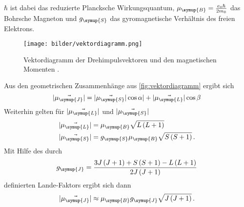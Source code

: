 $\hbar$ ist dabei das reduzierte Plancksche Wirkungsquantum, $\mu_{\symup{B}}=\frac{e_{0}\hbar}{2m_{0}}$ das
Bohrsche Magneton und $g_{\symup{S}}$ das gyromagnetische Verhältnis des freien Elektrons.
\begin{figure}
    \centering
    \texttt{[image: bilder/vektordiagramm.png]}
    \caption{Vektordiagramm der Drehimpulsvektoren und den magnetischen Momenten \cite{sample}.}
    \label{fig:vektordiagramm}
\end{figure}
Aus den geometrischen Zusammenhänge aus \autoref{fig:vektordiagramm} ergibt sich
\begin{equation}
    |\vec{\mu_{\symup{J}}}| = |\vec{\mu_{\symup{S}}}|\cos{\alpha}| + |\vec{\mu_{\symup{L}}}|\cos{\beta}
\end{equation}
Weiterhin gelten für $|\vec{\mu_{\symup{L}}}|$ und $|\vec{\mu_{\symup{S}}}|$
\begin{align*}
    |\vec{\mu_{\symup{L}}}| &= \mu_{\symup{B}}\sqrt{L\left(L+1\right)} \\
    |\vec{\mu_{\symup{S}}}| &= g_{\symup{S}}\mu_{\symup{B}}\sqrt{S\left(S+1\right)}\,.
\end{align*}
Mit Hilfe des durch
\begin{equation*}
    g_{\symup{J}} = \frac{3J\left(J+1\right) + S\left(S+1\right)- L\left(L+1\right)}{2J\left(J+1\right)}
\end{equation*}
definierten Lande-Faktors ergibt sich dann
\begin{equation}
    |\vec{\mu_{\symup{J}}}| \approx \mu_{\symup{B}}g_{\symup{J}}\sqrt{J\left(J+1\right)}\,.
\end{equation}